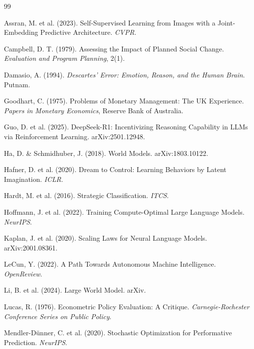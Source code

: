 \documentclass[11pt,a4paper]{article}
\begin{document}
\begin{thebibliography}{99}

Assran, M. et al. (2023).
Self-Supervised Learning from Images with a Joint-Embedding Predictive Architecture.
\textit{CVPR}.

Campbell, D. T. (1979).
Assessing the Impact of Planned Social Change.
\textit{Evaluation and Program Planning}, 2(1).

Damasio, A. (1994).
\textit{Descartes' Error: Emotion, Reason, and the Human Brain}. Putnam.

Goodhart, C. (1975).
Problems of Monetary Management: The UK Experience.
\textit{Papers in Monetary Economics}, Reserve Bank of Australia.

Guo, D. et al. (2025).
DeepSeek-R1: Incentivizing Reasoning Capability in LLMs via Reinforcement Learning.
arXiv:2501.12948.

Ha, D. \& Schmidhuber, J. (2018).
World Models.
arXiv:1803.10122.

Hafner, D. et al. (2020).
Dream to Control: Learning Behaviors by Latent Imagination.
\textit{ICLR}.

Hardt, M. et al. (2016).
Strategic Classification.
\textit{ITCS}.

Hoffmann, J. et al. (2022).
Training Compute-Optimal Large Language Models.
\textit{NeurIPS}.

Kaplan, J. et al. (2020).
Scaling Laws for Neural Language Models.
arXiv:2001.08361.

LeCun, Y. (2022).
A Path Towards Autonomous Machine Intelligence.
\textit{OpenReview}.

Li, B. et al. (2024).
Large World Model.
arXiv.

Lucas, R. (1976).
Econometric Policy Evaluation: A Critique.
\textit{Carnegie-Rochester Conference Series on Public Policy}.

Mendler-D\"{u}nner, C. et al. (2020).
Stochastic Optimization for Performative Prediction.
\textit{NeurIPS}.


\end{thebibliography}
\end{document}
